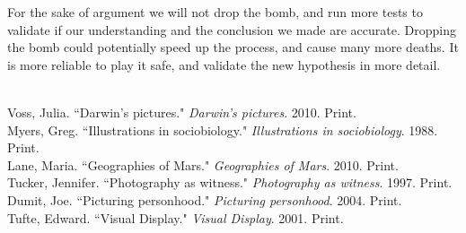 \documentclass[11pt, oneside]{article}
\begin{document}
\par For the sake of argument we will not drop the bomb, and run more tests to validate if our understanding and the conclusion we made are accurate. Dropping the bomb could potentially speed up the process, and cause many more deaths. It is more reliable to play it safe, and validate the new hypothesis in more detail.

\begin{workscited}
\bibent \\
\bibent Voss, Julia. ``Darwin's pictures."  \textit{Darwin's pictures}.  2010. Print. \\
\bibent Myers, Greg. ``Illustrations in sociobiology."  \textit{Illustrations in sociobiology}.  1988. Print. \\
\bibent Lane, Maria. ``Geographies of Mars."  \textit{Geographies of Mars}.  2010. Print. \\
\bibent Tucker, Jennifer. ``Photography as witness."  \textit{Photography as witness}.  1997. Print. \\
\bibent Dumit, Joe. ``Picturing personhood."  \textit{Picturing personhood}.  2004. Print. \\
\bibent Tufte, Edward. ``Visual Display."  \textit{Visual Display}.  2001. Print. \\
\end{workscited}
\end{document}
